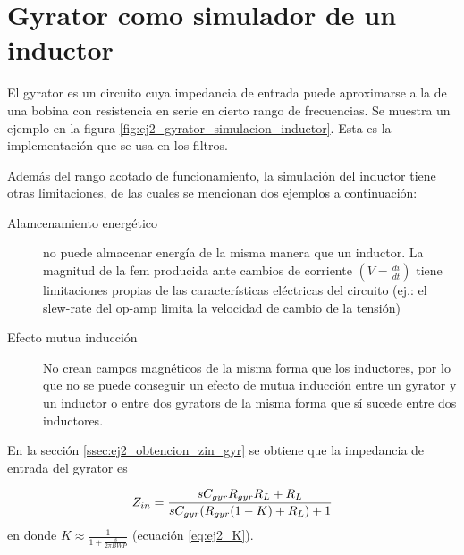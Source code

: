 \section{Gyrator como simulador de un inductor}

El gyrator es un circuito cuya impedancia de entrada puede aproximarse a la de una bobina con resistencia en serie en cierto rango de frecuencias. Se muestra un ejemplo en la figura \ref{fig:ej2_gyrator_simulacion_inductor}. Esta es la implementaci\'on que se usa en los filtros.

Adem\'as del rango acotado de funcionamiento, la simulaci\'on del inductor tiene otras limitaciones, de las cuales se mencionan dos ejemplos a continuaci\'on:

\begin{description}	
	\item[Alamcenamiento energ\'etico] no puede almacenar energ\'ia de la misma manera que un inductor. La magnitud de la fem producida ante cambios de corriente $\left( V = \frac{di}{dt} \right) $ tiene limitaciones propias de las caracter\'isticas el\'ectricas del circuito (ej.: el slew-rate del op-amp limita la velocidad de cambio de la tensi\'on) 
	
	\item[Efecto mutua inducci\'on] No crean campos magn\'eticos de la misma forma que los inductores, por lo que no se puede conseguir un efecto de mutua inducci\'on entre un gyrator y un inductor o entre dos gyrators de la misma forma que s\'i sucede entre dos inductores. 

\end{description}





\begin{figure*}[htbp]
	\centering
	
	
	\caption{Uso de gyrator como inductor}
	\label{fig:ej2_gyrator_simulacion_inductor}
\end{figure*}




En la secci\'on \ref{ssec:ej2_obtencion_zin_gyr} se obtiene que la impedancia de entrada del gyrator es

\begin{equation}
	Z_{in}= \frac{ sC_{gyr}R_{gyr}R_L+R_L}{sC_{gyr}(R_{gyr}(1-K)+R_L) + 1} \label{eq:ej2_zin_gyr_sin_aprox} \\
\end{equation}
	en donde	$K  \approx\frac{1}{1+\frac{s}{2\pi BWP}}$ (ecuaci\'on \ref{eq:ej2_K}).
 
